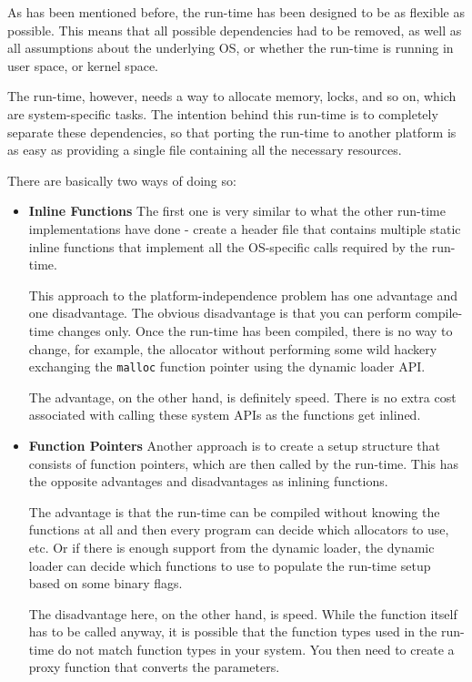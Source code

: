 As has been mentioned before, the run-time has been designed to be as flexible as possible. This means that all possible dependencies had to be removed, as well as all assumptions about the underlying OS, or whether the run-time is running in user space, or kernel space.

The run-time, however, needs a way to allocate memory, locks, and so on, which are system-specific tasks. The intention behind this run-time is to completely separate these dependencies, so that porting the run-time to another platform is as easy as providing a single file containing all the necessary resources.

There are basically two ways of doing so:

\begin{itemize}
\item{\bf{Inline Functions}}
The first one is very similar to what the other run-time implementations have done - create a header file that contains multiple static inline functions that implement all the OS-specific calls required by the run-time.

This approach to the platform-independence problem has one advantage and one disadvantage. The obvious disadvantage is that you can perform compile-time changes only. Once the run-time has been compiled, there is no way to change, for example, the allocator without performing some wild hackery exchanging the \verb=malloc= function pointer using the dynamic loader API.

The advantage, on the other hand, is definitely speed. There is no extra cost associated with calling these system APIs as the functions get inlined.

\item{\bf{Function Pointers}}
Another approach is to create a setup structure that consists of function pointers, which are then called by the run-time. This has the opposite advantages and disadvantages as inlining functions.

The advantage is that the run-time can be compiled without knowing the functions at all and then every program can decide which allocators to use, etc. Or if there is enough support from the dynamic loader, the dynamic loader can decide which functions to use to populate the run-time setup based on some binary flags.

The disadvantage here, on the other hand, is speed. While the function itself has to be called anyway, it is possible that the function types used in the run-time do not match function types in your system. You then need to create a proxy function that converts the parameters.


\end{itemize}

